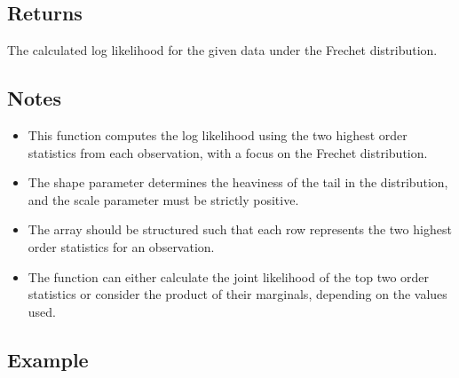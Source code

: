 \documentclass[a4paper,11pt,openany,english]{sphinxmanual}
\begin{document}
\begin{fulllineitems}
\subsection{Returns}
\label{\detokenize{api_topt:id87}}\begin{description}
\sphinxAtStartPar
The calculated log likelihood for the given data under the Frechet distribution.

\end{description}


\subsection{Notes}
\label{\detokenize{api_topt:id88}}\begin{itemize}
\item {} 
\sphinxAtStartPar
This function computes the log likelihood using the two highest order statistics from each observation, with a focus on the Frechet distribution.

\item {} 
\sphinxAtStartPar
The shape parameter  determines the heaviness of the tail in the distribution, and the scale parameter  must be strictly positive.

\item {} 
\sphinxAtStartPar
The  array should be structured such that each row represents the two highest order statistics for an observation.

\item {} 
\sphinxAtStartPar
The function can either calculate the joint likelihood of the top two order statistics or consider the product of their marginals, depending on the values used.

\end{itemize}


\subsection{Example}
\label{\detokenize{api_topt:id89}}
\begin{sphinxVerbatim}[commandchars=\\\{\}]
  \PYG{p}{[}\PYG{p}{[} \PYG{p}{]} \PYG{p}{[} \PYG{p}{]} \PYG{p}{[} \PYG{p}{]} \PYG{p}{[} \PYG{p}{]}\PYG{p}{]}
   
\end{sphinxVerbatim}

\end{fulllineitems}
\end{document}
